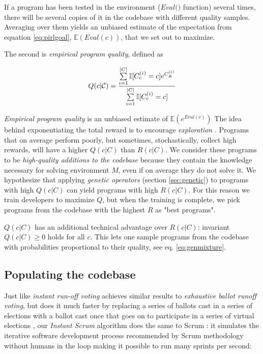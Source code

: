 If a program has been tested in the environment ($\textit{Eval()}$ function) several times, there will be several copies of it in the codebase with different quality samples.
Averaging over them yields an unbiased estimate of the expectation from equation \ref{eq:pirlgoal}, $\mathbb{E}(\mathit{Eval}(c))$, that we set out to maximize.

The second is \emph{empirical program quality}, defined as

\begin{equation}
    Q(c|\mathcal{C}) = \frac{\sum\limits_{i=1}^{|C|} \mathbb{I}[C_c^{(i)}=c] e^{C_R^{(i)}}}{\sum\limits_{i=1}^{|C|} \mathbb{I}[C_c^{(i)}=c]}
    \label{eq:empquality}
\end{equation}

\emph{Empirical program quality} is an unbiased estimate of $\mathbb{E}(e^{\mathit{Eval}(c)})$
The idea behind exponentiating the total reward is to encourage \emph{exploration} \cite{exploration}.
Programs that on average perform poorly, but sometimes, stochastically, collect high rewards, will have a higher $Q(c|C)$ than $R(c|C)$.
We consider these programs to be \emph{high-quality additions to the codebase} because they contain the knowledge necessary for solving environment $M$, even if on average they do not solve it.
We hypothesize that applying \emph{genetic operators} (section \ref{sec:genetic}) to programs with high $Q(c|C)$ can yield programs with high $R(c|C)$.
For this reason we train developers to maximize $Q$, but when the training is complete, we pick programs from the codebase with the highest $R$ as "best programs".
 
$Q(c|C)$ has an additional technical advantage over $R(c|C)$: invariant $Q(c|C) \geq 0$ holds for all $c$.
This lets one sample programs from the codebase with probabilities proportional to their quality, see eq. \ref{eq:genmixture}.

\newpage \subsection{Populating the codebase}

Just like \emph{instant run-off voting} achieves similar results to \emph{exhaustive ballot runoff voting}, but does it much faster by replacing a series of ballots cast in a series of elections with a ballot cast once that goes on to participate in a series of virtual elections \cite{votingsystems}, our \emph{Instant Scrum} algorithm does the same to Scrum \cite{scrum}: it simulates the iterative software development process recommended by Scrum methodology without humans in the loop making it possible to run many sprints per second:

